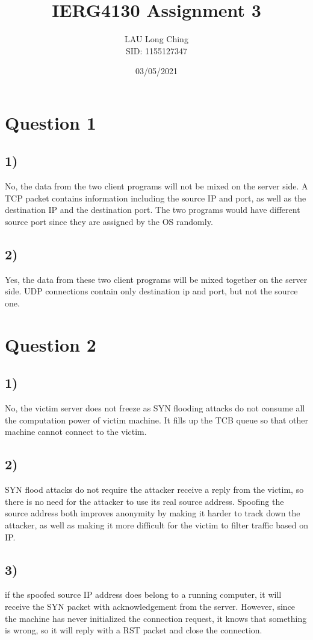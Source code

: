 \documentclass[a4paper]{article}
\title{\vspace{-1.5cm}IERG4130 Assignment 3}
\author{LAU Long Ching\\SID: 1155127347\\
        
}
\date{03/05/2021}
\begin{document}
\maketitle
\section*{Question 1}
\subsection*{1)}
No, the data from the two client programs will not be mixed on the server side. A TCP packet contains information including the source IP and port, as well as the destination IP and the destination port. The two programs would have different source port since they are assigned by the OS randomly.
\subsection*{2)}
Yes, the data from these two client programs will be mixed together on the server side. UDP connections contain only destination ip and port, but not the source one.
\section*{Question 2}
\subsection*{1)}
No, the victim server does not freeze as SYN flooding attacks do not consume all the computation power of victim machine. It fills up the TCB queue so that other machine cannot connect to the victim.
\subsection*{2)}
SYN flood attacks do not require the attacker receive a reply from the victim, so there is no need for the attacker to use its real source address. Spoofing the source address both improves anonymity by making it harder to track down the attacker, as well as making it more difficult for the victim to filter traffic based on IP.
\subsection*{3)}
if the spoofed source IP address does belong to a running computer, it will receive the SYN packet with acknowledgement from the server. However, since the machine has never initialized the connection request, it knows that something is wrong, so it will reply with a RST packet and close the connection.
\end{document}
